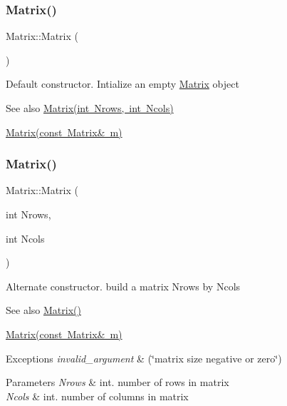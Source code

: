 \subsubsection{\texorpdfstring{Matrix()}{Matrix()}\hspace{0.1cm}{\footnotesize\ttfamily [1/3]}}
{\footnotesize\ttfamily Matrix\+::\+Matrix (\begin{DoxyParamCaption}{ }\end{DoxyParamCaption})}

Default constructor. Intialize an empty \mbox{\hyperlink{classMatrix}{Matrix}} object \begin{DoxySeeAlso}{See also}
\mbox{\hyperlink{classMatrix_a135a15de1126d735bb95fcc839d739d7}{Matrix(int Nrows, int Ncols)}} 

\mbox{\hyperlink{classMatrix_a765f4dcb51b6829311cc3e7576388423}{Matrix(const Matrix\& m)}} 
\end{DoxySeeAlso}
\mbox{\label{classMatrix_a135a15de1126d735bb95fcc839d739d7}} 
\subsubsection{\texorpdfstring{Matrix()}{Matrix()}\hspace{0.1cm}{\footnotesize\ttfamily [2/3]}}
{\footnotesize\ttfamily Matrix\+::\+Matrix (\begin{DoxyParamCaption}\item[{int}]{Nrows,  }\item[{int}]{Ncols }\end{DoxyParamCaption})}

Alternate constructor. build a matrix Nrows by Ncols \begin{DoxySeeAlso}{See also}
\mbox{\hyperlink{classMatrix_a2dba13c45127354c9f75ef576f49269b}{Matrix()}} 

\mbox{\hyperlink{classMatrix_a765f4dcb51b6829311cc3e7576388423}{Matrix(const Matrix\& m)}} 
\end{DoxySeeAlso}

\begin{DoxyExceptions}{Exceptions}
{\em invalid\+\_\+argument} & (\char`\"{}matrix size negative or zero\char`\"{}) \\
\hline
\end{DoxyExceptions}

\begin{DoxyParams}{Parameters}
{\em Nrows} & int. number of rows in matrix \\
\hline
{\em Ncols} & int. number of columns in matrix \\
\hline
\end{DoxyParams}
\mbox{\label{classMatrix_a765f4dcb51b6829311cc3e7576388423}} 
